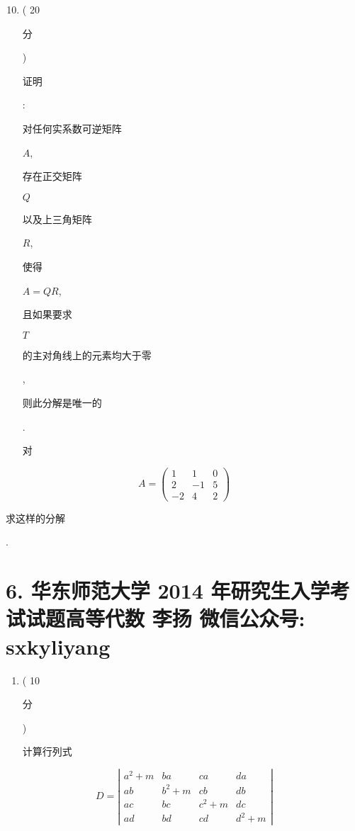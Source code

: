 \documentclass[10pt]{article}
\begin{document}
\begin{enumerate}
  \setcounter{enumi}{9}
  \item ( 20 \begin{CJK}{UTF8}{mj}分\end{CJK}) \begin{CJK}{UTF8}{mj}证明\end{CJK}: \begin{CJK}{UTF8}{mj}对任何实系数可逆矩阵\end{CJK} $A$, \begin{CJK}{UTF8}{mj}存在正交矩阵\end{CJK} $Q$ \begin{CJK}{UTF8}{mj}以及上三角矩阵\end{CJK} $R$, \begin{CJK}{UTF8}{mj}使得\end{CJK} $A=Q R$, \begin{CJK}{UTF8}{mj}且如果要求\end{CJK} $T$ \begin{CJK}{UTF8}{mj}的主对角线上的元素均大于零\end{CJK}, \begin{CJK}{UTF8}{mj}则此分解是唯一的\end{CJK}. \begin{CJK}{UTF8}{mj}对\end{CJK}
\end{enumerate}
$$
A=\left(\begin{array}{ccc}
1 & 1 & 0 \\
2 & -1 & 5 \\
-2 & 4 & 2
\end{array}\right)
$$
\begin{CJK}{UTF8}{mj}求这样的分解\end{CJK}.

\section{6. 华东师范大学 2014 年研究生入学考试试题高等代数 
 李扬 
 微信公众号: sxkyliyang}
\begin{enumerate}
  \item ( 10 \begin{CJK}{UTF8}{mj}分\end{CJK}) \begin{CJK}{UTF8}{mj}计算行列式\end{CJK}
\end{enumerate}
$$
D=\left|\begin{array}{cccc}
a^{2}+m & b a & c a & d a \\
a b & b^{2}+m & c b & d b \\
a c & b c & c^{2}+m & d c \\
a d & b d & c d & d^{2}+m
\end{array}\right|
$$
\end{document}
